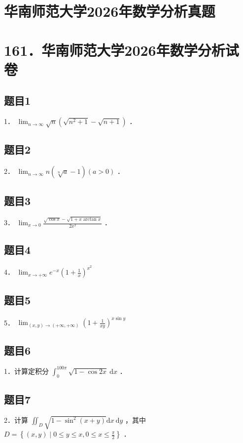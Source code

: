 \documentclass{article}
\begin{document}
\section*{华南师范大学2026年数学分析真题}
\section*{161．华南师范大学2026年数学分析试卷}

\subsection{题目1}
1． \(\lim _{n \rightarrow \infty} \sqrt{n}\left(\sqrt{n^{2}+1}-\sqrt{n+1}\right)\) ．

\subsection{题目2}
2． \(\lim _{n \rightarrow \infty} n(\sqrt[n]{a}-1)(a>0)\) ．

\subsection{题目3}
3． \(\lim _{x \rightarrow 0} \frac{\sqrt{\cos x}-\sqrt{1+x \arctan x}}{2 x^{2}}\) ．

\subsection{题目4}
4． \(\lim _{x \rightarrow+\infty} e^{-x}\left(1+\frac{1}{x}\right)^{x^{2}}\)

\subsection{题目5}
5． \(\lim _{(x, y) \rightarrow(+\infty,+\infty)}\left(1+\frac{1}{x y}\right)^{x \sin y}\)

\subsection{题目6}
1．计算定积分 \(\int_{0}^{100 \pi} \sqrt{1-\cos 2 x} \mathrm{~d} x\) ．

\subsection{题目7}
2．计算 \(\iint_{D} \sqrt{1-\sin ^{2}(x+y)} \mathrm{d} x \mathrm{~d} y\) ，其中 \(D=\left\{(x, y) \mid 0 \leq y \leq x, 0 \leq x \leq \frac{\pi}{2}\right\}\) ．
\end{document}
